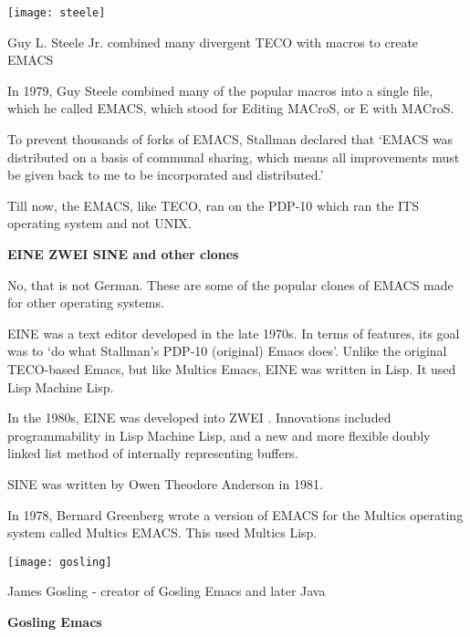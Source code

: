 \begin{marginfigure}
  \texttt{[image: steele]}
  \caption{Guy L. Steele Jr. combined many divergent TECO with macros to create EMACS}
\end{marginfigure}


In 1979, Guy Steele combined many of the popular
macros into a single file, which he called EMACS,
which stood for Editing MACroS, or E with MACroS.

To prevent thousands of forks of EMACS, Stallman
declared that
`EMACS was distributed on a basis of communal sharing,
which means all improvements must be given back to me
to be incorporated and distributed.'

Till now, the EMACS, like TECO, ran on the PDP-10
which ran the ITS operating system and not UNIX.

\textbf{EINE ZWEI SINE and other clones}

No, that is not German.
These are some of the popular clones of EMACS
made for other operating systems.

EINE
was a text editor developed in the late 1970s.
In terms of features, its goal was to `do what Stallman's
PDP-10 (original) Emacs does'.
Unlike the original TECO-based Emacs, but like Multics Emacs,
EINE was written in Lisp. It used Lisp Machine Lisp.

In the 1980s, EINE was developed into ZWEI
.
Innovations included programmability in Lisp Machine Lisp,
and a new and more flexible doubly linked
list method of internally representing buffers.


SINE
was written by Owen Theodore Anderson in 1981.

In 1978, Bernard Greenberg wrote a version of EMACS
for the Multics operating system called Multics EMACS.
This used Multics Lisp.


\begin{marginfigure}
  \texttt{[image: gosling]}
  \caption{James Gosling - creator of Gosling Emacs and later Java}
\end{marginfigure}

\textbf{Gosling Emacs}

